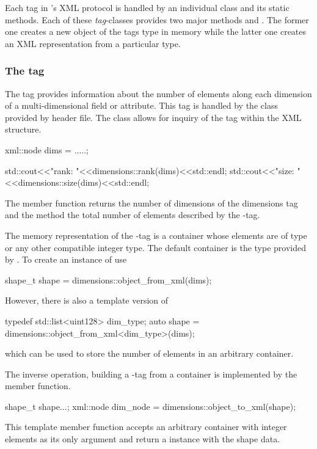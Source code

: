 {Each tag in \libpniio's XML protocol is handled by an individual class and its
static methods. Each of these \emph{tag}-classes provides two major methods 
 and . The former one creates a new
object of the tags type in memory while the latter one creates an XML
representation from a particular type.

\subsubsection{The  tag}

The  tag provides information about the number of elements 
along each dimension of a multi-dimensional field or attribute. This tag is
handled by the  class provided by 
header file. 
The  class allows for inquiry of the  tag within
the XML structure. 
\begin{cppcode}
xml::node dims = .....;

std::cout<<"rank: "<<dimensions::rank(dims)<<std::endl;
std::cout<<"size: "<<dimensions::size(dims)<<std::endl;
\end{cppcode}
The  member function returns the number of dimensions of the 
dimensions tag and the  method the total number of elements 
described by the -tag.

The memory representation of the -tag is a container 
whose elements are of type  or any other compatible integer type. 
The default container is the  type provided by \libpnicore. 
To create an instance of  use
\begin{cppcode}
shape_t shape = dimensions::object_from_xml(dims);
\end{cppcode}
However, there is also a template version of  
\begin{cppcode}
typedef std::list<uint128> dim_type;
auto shape = dimensions::object_from_xml<dim_type>(dims);
\end{cppcode}
which can be used to store the number of elements in an arbitrary container.

The inverse operation, building a -tag from a container is 
implemented by the  member function. 
\begin{cppcode}
shape_t shape{...};
xml::node dim_node = dimensions::object_to_xml(shape);
\end{cppcode}
This template member function accepts an arbitrary container with integer 
elements as its only argument and return a  instance 
with the shape data.


}
